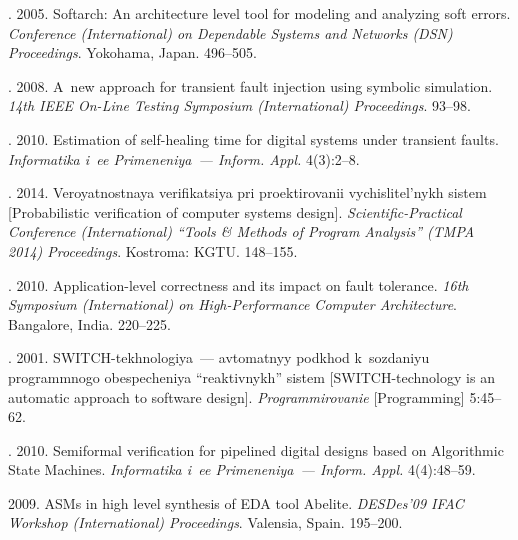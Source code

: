   \begin{multicols}{2}

\renewcommand{\bibname}{\protect\rmfamily References}

{\small\frenchspacing
 {%
 \begin{thebibliography}{99}

. 2005. Softarch: An architecture level tool for modeling 
and analyzing soft errors. \textit{Conference (International) on Dependable Systems and Networks (DSN) 
Proceedings}. Yokohama, Japan. 496--505.

. 2008. A~new approach for transient fault 
injection using symbolic simulation. \textit{14th IEEE On-Line Testing Symposium 
(International) Proceedings}. 93--98.

. 2010. Estimation of self-healing time for digital systems under 
transient faults. \textit{Informatika i~ee Primeneniya~--- Inform. Appl.} 4(3):2--8. 

. 2014. Veroyatnostnaya verifikatsiya pri 
proektirovanii vychislitel'nykh sistem [Probabilistic verification of computer systems design]. 
\textit{Scientific-Practical Conference (International) ``Tools \& Methods of Program Analysis'' (TMPA 2014) 
Proceedings}. Kostroma: KGTU. 148--155.

. 2010.  Application-level correctness and its impact on fault tolerance. 
\textit{16th Symposium (International) on High-Performance Computer Architecture}. Bangalore, India.  
220--225.

. 2001. SWITCH-tekhnologiya~--- avtomatnyy podkhod k~sozdaniyu 
programmnogo obespecheniya ``reaktivnykh'' sistem [SWITCH-technology is an automatic approach to 
software design]. \textit{Programmirovanie} [Programming] 5:45--62.   

. 2010. Semiformal verification for pipelined digital designs 
based on Algorithmic State Machines. \textit{Informatika i~ee Primeneniya~--- Inform. Appl.} 4(4):48--59.

 2009. ASMs in high level synthesis of EDA tool Abelite. \textit{DESDes'09 IFAC Workshop 
(International) Proceedings}. Valensia, Spain. 195--200.


\end{thebibliography}}}
\end{multicols}
